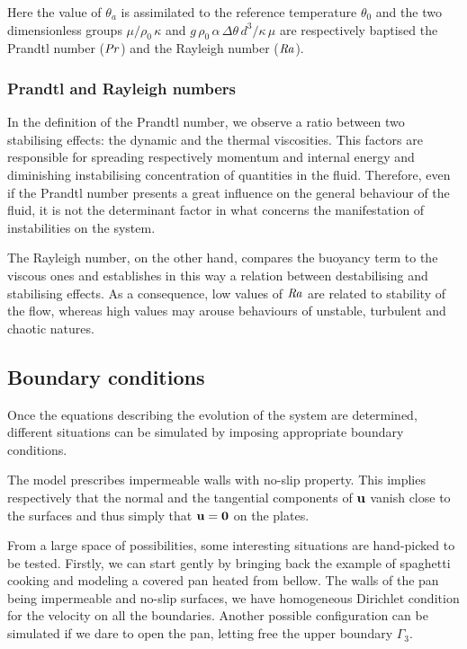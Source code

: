 \documentclass[12pt,oneside]{article}
\newcommand\Pra{\mbox{\textit{Pr}}} 									%
\newcommand\Ray{\mbox{\textit{Ra}}}  									%
\begin{document}
Here the value of $\theta_a$ is assimilated to the reference temperature $\theta_0$ and the two dimensionless groups $\mu / \rho_0 \, \kappa$ and $g \, \rho_0 \, \alpha \, \Delta \theta \, d^3 / \kappa \, \mu$ are respectively baptised the Prandtl number ($\Pra$) and the Rayleigh number ($\Ray$).

\subsubsection{Prandtl and Rayleigh numbers}

In the definition of the Prandtl number, we observe a ratio between two stabilising effects: the dynamic and the thermal viscosities. This factors are responsible for spreading respectively momentum and internal energy and diminishing instabilising concentration of quantities in the fluid. Therefore, even if the Prandtl number presents a great influence on the general behaviour of the fluid, it is not the determinant factor in what concerns the manifestation of instabilities on the system.

The Rayleigh number, on the other hand, compares the buoyancy term to the viscous ones and establishes in this way a relation between destabilising and stabilising effects. As a consequence, low values of $\Ray$ are related to stability of the flow, whereas high values may arouse behaviours of unstable, turbulent and chaotic natures.


\subsection{Boundary conditions}

Once the equations describing the evolution of the system are determined, different situations can be simulated by imposing appropriate boundary conditions.

The model prescribes impermeable walls with no-slip property. This implies respectively that the normal and the tangential components of $\bf{u}$ vanish close to the surfaces and thus simply that $\bf{u} = \bf{0}$ on the plates.

From a large space of possibilities, some interesting situations are hand-picked to be tested. Firstly, we can start gently by bringing back the example of spaghetti cooking and modeling a covered pan heated from bellow. The walls of the pan being impermeable and no-slip surfaces, we have homogeneous Dirichlet condition for the velocity on all the boundaries. Another possible configuration can be simulated if we dare to open the pan, letting free the upper boundary $\Gamma_3$.
\end{document}
